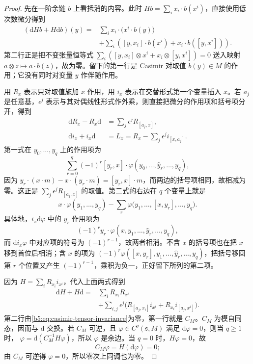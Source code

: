 \begin{proof}
	先在一阶余链 \(b\) 上看抵消的内容。此时 \(Hb=\sum_i x_i\cdot b(x^i)\)，直接使用低次数微分得到
	\[
		\begin{aligned}
			(\mathrm{d}Hb+H\mathrm{d}b)(y) ={}&\sum_i x_i\cdot\bigl(x^i\cdot b(y)\bigr)\\
			&+\sum_i\left([y,x_i]\cdot b(x^i) +x_i\cdot b([y,x^i])\right).
		\end{aligned}
	\]
	第二行正是把不变张量恒等式 \(\sum_i([y,x_i]\otimes x^i+x_i\otimes[y,x^i])=0\) 送入映射 \(a\otimes z\mapsto a\cdot b(z)\)，故为零。留下的第一行是 Casimir 对取值 \(b(y)\in M\) 的作用；它没有同时对变量 \(y\) 作伴随作用。

	用 \(R_x\) 表示只对取值施加 \(x\) 作用，用 \(i_x\) 表示在交替形式第一个变量插入 \(x\)。若 \(a_j\) 是任意基，\(\epsilon^j\) 表示与其对偶线性形式作外乘，则直接把微分的作用项和括号项分开，得到
	\begin{align*}
		\mathrm{d}R_x-R_x\mathrm{d}&=\sum_j\epsilon^j R_{[a_j,x]},\\
		\mathrm{d}i_x+i_x\mathrm{d}&=L_x =R_x-\sum_j\epsilon^j i_{[x,a_j]}.
	\end{align*}
	第一式在 \(y_0,\ldots,y_q\) 上的作用项为
	\[
		\sum_{r=0}^q(-1)^r[y_r,x]\cdot\varphi(y_0,\ldots,\widehat y_r,\ldots,y_q),
	\]
	因为 \(y_r\cdot(x\cdot m)-x\cdot(y_r\cdot m)=[y_r,x]\cdot m\)，而两边的括号项相同，故相减为零。这正是 \(\sum_j\epsilon^jR_{[a_j,x]}\) 的取值。第二式的右边在 \(q\) 个变量上就是
	\[
		x\cdot\varphi(y_1,\ldots,y_q) -\sum_r\varphi\bigl(y_1,\ldots,[x,y_r],\ldots,y_q\bigr).
	\]
	具体地，\(i_x\mathrm d\varphi\) 中的 \(y_r\) 作用项为
	\[
		(-1)^r y_r\cdot\varphi(x,y_1,\ldots,\widehat y_r,\ldots,y_q),
	\]
	而 \(\mathrm d i_x\varphi\) 中对应项的符号为 \((-1)^{r-1}\)，故两者相消。不含 \(x\) 的括号项也在把 \(x\) 移到首位后相消；含 \(x\) 的项为 \((-1)^r\varphi([x,y_r],y_1,\ldots,\widehat y_r,\ldots,y_q)\)，把括号移回第 \(r\) 个位置又产生 \((-1)^{r-1}\)，乘积为负一，正好留下所列的第二项。

	因为 \(H=\sum_i R_{x_i}i_{x^i}\)，代入上面两式得到
	\begin{align*}
		\mathrm{d}H+H\mathrm{d} ={}&\sum_i R_{x_i}R_{x^i}\\
		&+\sum_{i,j}\epsilon^j \bigl(R_{[a_j,x_i]}i_{x^i}+R_{x_i}i_{[a_j,x^i]}\bigr).
	\end{align*}
	第二行由\eqref{b5:eq:casimir-tensor-invariance}为零，第一行就是 \(C_M\)。\(C_M\) 为模自同态，因而与 \(\mathrm{d}\) 交换。若 \(C_M\) 可逆，且 \(\varphi\in C^q(\mathfrak s,M)\) 满足 \(\mathrm{d}\varphi=0\)，则当 \(q\ge1\) 时， \(\varphi=\mathrm{d}(C_M^{-1}H\varphi)\)，所以 \(\varphi\) 是余边。当 \(q=0\) 时，\(H\varphi=0\)，故
	\[
		C_M\varphi=H(\mathrm{d}\varphi)=0;
	\]
	由 \(C_M\) 可逆得 \(\varphi=0\)，所以零次上同调也为零。
\end{proof}

